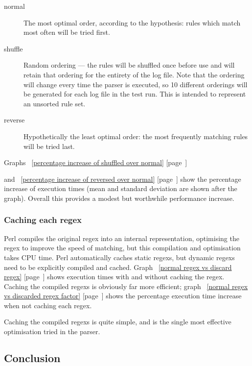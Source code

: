 \documentclass[a4paper,12pt,draft]{article}
\newcommand{\refwithpage}[1]{%
    \empty{}\ref{#1} [page~\pageref{#1}]%
}
\begin{document}
\begin{description}

    \item [normal]  The most optimal order, according to the hypothesis:
        rules which match most often will be tried first.

    \item [shuffle] Random ordering --- the rules will be shuffled once
        before use and will retain that ordering for the entirety of the
        log file.  Note that the ordering will change every time the parser
        is executed, so 10 different orderings will be generated for each
        log file in the test run.  This is intended to represent an
        unsorted rule set.

    \item [reverse] Hypothetically the least optimal order: the most
        frequently matching rules will be tried last.

\end{description}

Graphs~\refwithpage{percentage increase of shuffled over normal}
and~\refwithpage{percentage increase of reversed over normal} show the
percentage increase of execution times (mean and standard deviation are
shown after the graph).  Overall this provides a modest but worthwhile
performance increase.

\subsubsection{Caching each regex}

Perl compiles the original regex into an internal representation,
optimising the regex to improve the speed of matching, but this compilation
and optimisation takes CPU time.  Perl automatically caches static regexs,
but dynamic regexs need to be explicitly compiled and cached.
Graph~\refwithpage{normal regex vs discard regex} shows execution times
with and without caching the regex.  Caching the compiled regexs is
obviously far more efficient; graph~\refwithpage{normal regex vs discarded
regex factor} shows the percentage execution time increase when not caching
each regex.

Caching the compiled regexs is quite simple, and is the single most
effective optimisation tried in the parser.

\subsection{Conclusion}
\end{document}

